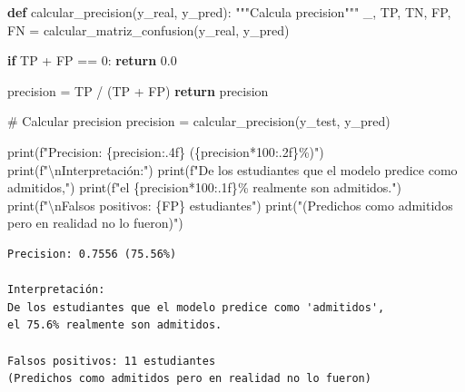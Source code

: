 \documentclass[
  doc,
  floatsintext,
  longtable,
  a4paper,
  nolmodern,
  notxfonts,
  notimes,
  12pt,
  colorlinks=true,linkcolor=blue,citecolor=blue,urlcolor=blue]{apa7}
\newenvironment{Shaded}{\begin{snugshade}}{\end{snugshade}}
\newcommand{\BuiltInTok}[1]{\textcolor[rgb]{0.00,0.23,0.31}{#1}}
\newcommand{\CharTok}[1]{\textcolor[rgb]{0.13,0.47,0.30}{#1}}
\newcommand{\CommentTok}[1]{\textcolor[rgb]{0.37,0.37,0.37}{#1}}
\newcommand{\ControlFlowTok}[1]{\textcolor[rgb]{0.00,0.23,0.31}{\textbf{#1}}}
\newcommand{\DecValTok}[1]{\textcolor[rgb]{0.68,0.00,0.00}{#1}}
\newcommand{\FloatTok}[1]{\textcolor[rgb]{0.68,0.00,0.00}{#1}}
\newcommand{\KeywordTok}[1]{\textcolor[rgb]{0.00,0.23,0.31}{\textbf{#1}}}
\newcommand{\NormalTok}[1]{\textcolor[rgb]{0.00,0.23,0.31}{#1}}
\newcommand{\OperatorTok}[1]{\textcolor[rgb]{0.37,0.37,0.37}{#1}}
\newcommand{\SpecialCharTok}[1]{\textcolor[rgb]{0.37,0.37,0.37}{#1}}
\newcommand{\SpecialStringTok}[1]{\textcolor[rgb]{0.13,0.47,0.30}{#1}}
\newcommand{\StringTok}[1]{\textcolor[rgb]{0.13,0.47,0.30}{#1}}
\begin{document}
\begin{Shaded}
\begin{Highlighting}[]
\KeywordTok{def}\NormalTok{ calcular\_precision(y\_real, y\_pred):}
    \CommentTok{"""Calcula precision"""}
\NormalTok{    \_, TP, TN, FP, FN }\OperatorTok{=}\NormalTok{ calcular\_matriz\_confusion(y\_real, y\_pred)}
    
    \ControlFlowTok{if}\NormalTok{ TP }\OperatorTok{+}\NormalTok{ FP }\OperatorTok{==} \DecValTok{0}\NormalTok{:}
        \ControlFlowTok{return} \FloatTok{0.0}
    
\NormalTok{    precision }\OperatorTok{=}\NormalTok{ TP }\OperatorTok{/}\NormalTok{ (TP }\OperatorTok{+}\NormalTok{ FP)}
    \ControlFlowTok{return}\NormalTok{ precision}

\CommentTok{\# Calcular precision}
\NormalTok{precision }\OperatorTok{=}\NormalTok{ calcular\_precision(y\_test, y\_pred)}

\BuiltInTok{print}\NormalTok{(}\SpecialStringTok{f"Precision: }\SpecialCharTok{\{}\NormalTok{precision}\SpecialCharTok{:.4f\}}\SpecialStringTok{ (}\SpecialCharTok{\{}\NormalTok{precision}\OperatorTok{*}\DecValTok{100}\SpecialCharTok{:.2f\}}\SpecialStringTok{\%)"}\NormalTok{)}
\BuiltInTok{print}\NormalTok{(}\SpecialStringTok{f"}\CharTok{\textbackslash{}n}\SpecialStringTok{Interpretación:"}\NormalTok{)}
\BuiltInTok{print}\NormalTok{(}\SpecialStringTok{f"De los estudiantes que el modelo predice como \textquotesingle{}admitidos\textquotesingle{},"}\NormalTok{)}
\BuiltInTok{print}\NormalTok{(}\SpecialStringTok{f"el }\SpecialCharTok{\{}\NormalTok{precision}\OperatorTok{*}\DecValTok{100}\SpecialCharTok{:.1f\}}\SpecialStringTok{\% realmente son admitidos."}\NormalTok{)}
\BuiltInTok{print}\NormalTok{(}\SpecialStringTok{f"}\CharTok{\textbackslash{}n}\SpecialStringTok{Falsos positivos: }\SpecialCharTok{\{}\NormalTok{FP}\SpecialCharTok{\}}\SpecialStringTok{ estudiantes"}\NormalTok{)}
\BuiltInTok{print}\NormalTok{(}\StringTok{"(Predichos como admitidos pero en realidad no lo fueron)"}\NormalTok{)}
\end{Highlighting}
\end{Shaded}

\begin{verbatim}
Precision: 0.7556 (75.56%)

Interpretación:
De los estudiantes que el modelo predice como 'admitidos',
el 75.6% realmente son admitidos.

Falsos positivos: 11 estudiantes
(Predichos como admitidos pero en realidad no lo fueron)
\end{verbatim}
\end{document}
